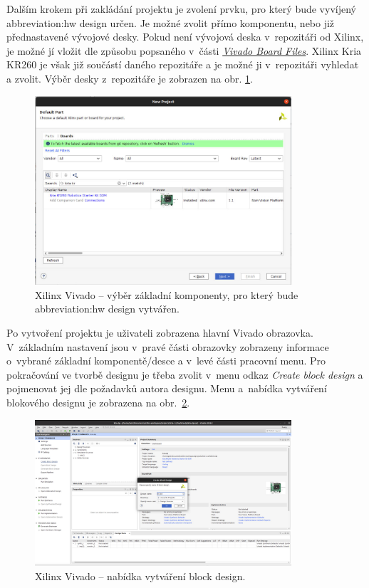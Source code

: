 \documentclass[a4paper, twoside, 11pt]{article}
\begin{document}
				Dalším krokem při zakládání projektu je zvolení prvku, pro který bude vyvíjený \gls{abbreviation:hw} design určen. Je možné zvolit přímo komponentu, nebo již přednastavené vývojové desky. Pokud není vývojová deska v~repozitáři od Xilinx, je možné jí vložit dle způsobu popsaného v~části \hyperref[subsec:vivado-board-files]{\textit{Vivado Board Files}}. Xilinx Kria KR260 je však již součástí daného repozitáře a je možné ji v~repozitáři vyhledat a zvolit. Výběr desky z~repozitáře je zobrazen na obr. \ref{fig:kr26-xilix-vivado-flow-02}.

				\begin{figure}[htbp!]
					\centering
					\includegraphics[width=0.85\textwidth]{src/png/kr26-xilinx-vivado-flow/kr26-xilix-vivado-flow-02.jpg}
					\caption{Xilinx Vivado – výběr základní komponenty, pro který bude \gls{abbreviation:hw} design vytvářen.}
					\label{fig:kr26-xilix-vivado-flow-02}
				\end{figure}

				Po vytvoření projektu je uživateli zobrazena hlavní Vivado obrazovka. V~základním nastavení jsou v~pravé části obrazovky zobrazeny informace o~vybrané základní komponentě/desce a v~levé části pracovní menu. Pro pokračování ve tvorbě designu je třeba zvolit v~menu odkaz \textit{Create block design} a pojmenovat jej dle požadavků autora designu. Menu a~nabídka vytváření blokového designu je zobrazena na obr.~\ref{fig:kr26-xilix-vivado-flow-03}.
		
				\begin{figure}[htbp!]
					\centering
					\includegraphics[width=0.85\textwidth]{src/png/kr26-xilinx-vivado-flow/kr26-xilix-vivado-flow-03.jpg}
					\caption{Xilinx Vivado – nabídka vytváření block design.}
					\label{fig:kr26-xilix-vivado-flow-03}
				\end{figure}
\end{document}
